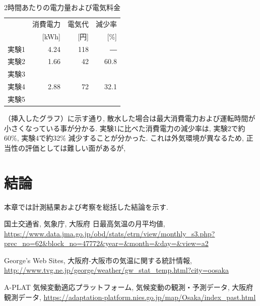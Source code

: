 \documentclass[a4j,fleqn,dvipdfmx,uplatex]{jsarticle}
\begin{document}
\begin{table}[htb]
  \caption{2時間あたりの電力量および電気料金}
  \label{table:electric_bill}
  \centering
  \begin{tabular}{lrrr}
     & 消費電力 & 電気代 & 減少率 \\[-1.5mm]
     & \small [kWh] & \small [円] &  \small [\%] \\
    \hline \hline
    実験1 & 4.24 & 118 & ― \\
    実験2 & 1.66 & 42 & 60.8 \\
    実験3 &  &  &  \\
    実験4 & 2.88 & 72 & 32.1 \\
    実験5 &  &  &  \\
    \hline
  \end{tabular}
\end{table}


（挿入したグラフ）に示す通り, 散水した場合は最大消費電力および運転時間が
小さくなっている事が分かる. 
実験1に比べた消費電力の減少率は, 実験2で約60\%, 実験4で約32\% 減少することが分かった. 
これは外気環境が異なるため, 正当性の評価としては難しい面があるが,  

\section{結論}
本章では計測結果および考察を総括した結論を示す. 

\begin{thebibliography}{99}
国土交通省, 気象庁, 大阪府 日最高気温の月平均値, 
\url{https://www.data.jma.go.jp/obd/stats/etrn/view/monthly_s3.php?prec_no=62&block_no=47772&year=&month=&day=&view=a2}\vspace{2mm}

George's Web Sites, 大阪府-大阪市の気温に関する統計情報, 
\url{http://www.tvg.ne.jp/george/weather/gw_stat_temp.html?city=oosaka}\vspace{2mm}

A-PLAT 気候変動適応プラットフォーム, 気候変動の観測・予測データ, 大阪府観測データ, 
\url{https://adaptation-platform.nies.go.jp/map/Osaka/index_past.html}\vspace{2mm}
\end{thebibliography}
%
%
%
\end{document}
